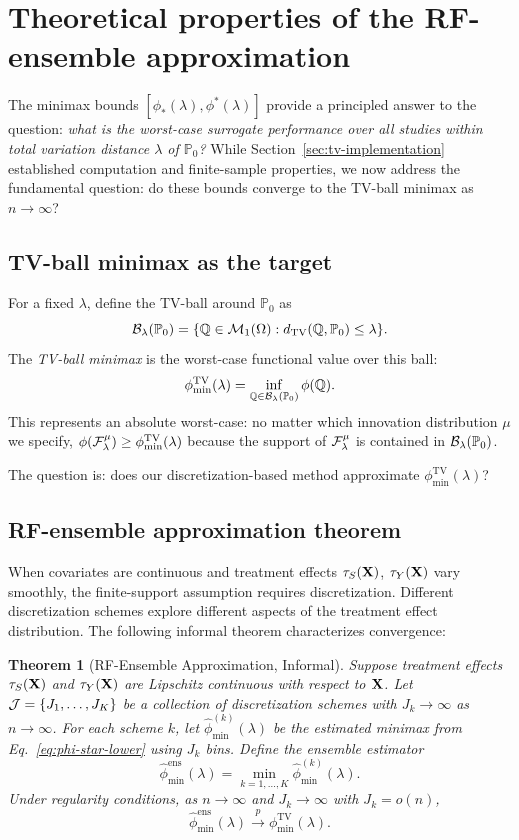 \documentclass{article}
\newtheorem{theorem}{Theorem}
\newcommand{\PP}{\mathbb{P}}
\begin{document}
\section{Theoretical properties of the RF-ensemble approximation}

The minimax bounds $[\phi_*(\lambda), \phi^*(\lambda)]$ provide a principled answer to the question: \emph{what is the worst-case surrogate performance over all studies within total variation distance $\lambda$ of $\PP_0$?} While Section~\ref{sec:tv-implementation} established computation and finite-sample properties, we now address the fundamental question: do these bounds converge to the TV-ball minimax as $n \to \infty$?

\subsection{TV-ball minimax as the target}

For a fixed $\lambda$, define the TV-ball around $\PP_0$ as
\[
    \cB_\lambda(\PP_0) = \{\Q \in \cM_1(\Omega) : d_{\mathrm{TV}}(\Q, \PP_0) \leq \lambda\}.
\]
The \emph{TV-ball minimax} is the worst-case functional value over this ball:
\begin{align}\label{eq:tv-minimax}
    \phi_{\min}^{\mathrm{TV}}(\lambda) = \inf_{\Q \in \cB_\lambda(\PP_0)} \phi(\Q).
\end{align}
This represents an absolute worst-case: no matter which innovation distribution $\mu$ we specify, $\phi(\mathcal{F}_\lambda^\mu) \geq \phi_{\min}^{\mathrm{TV}}(\lambda)$ because the support of $\mathcal{F}_\lambda^\mu$ is contained in $\cB_\lambda(\PP_0)$.

The question is: does our discretization-based method approximate $\phi_{\min}^{\mathrm{TV}}(\lambda)$?

\subsection{RF-ensemble approximation theorem}

When covariates are continuous and treatment effects $\tau_S(\mathbf{X})$, $\tau_Y(\mathbf{X})$ vary smoothly, the finite-support assumption requires discretization. Different discretization schemes explore different aspects of the treatment effect distribution. The following informal theorem characterizes convergence:

\begin{theorem}[RF-Ensemble Approximation, Informal]\label{thm:rf-ensemble}
Suppose treatment effects $\tau_S(\mathbf{X})$ and $\tau_Y(\mathbf{X})$ are Lipschitz continuous with respect to $\mathbf{X}$. Let $\mathcal{J} = \{J_1, \ldots, J_K\}$ be a collection of discretization schemes with $J_k \to \infty$ as $n \to \infty$. For each scheme $k$, let $\hat{\phi}_{\min}^{(k)}(\lambda)$ be the estimated minimax from Eq.~\eqref{eq:phi-star-lower} using $J_k$ bins. Define the ensemble estimator
\[
    \hat{\phi}_{\min}^{\mathrm{ens}}(\lambda) = \min_{k=1,\ldots,K} \hat{\phi}_{\min}^{(k)}(\lambda).
\]
Under regularity conditions, as $n \to \infty$ and $J_k \to \infty$ with $J_k = o(n)$,
\[
    \hat{\phi}_{\min}^{\mathrm{ens}}(\lambda) \xrightarrow{p} \phi_{\min}^{\mathrm{TV}}(\lambda).
\]
\end{theorem}
\end{document}

